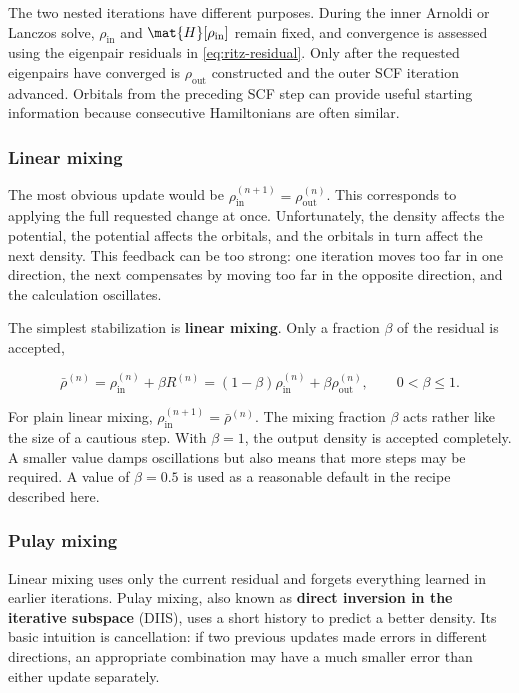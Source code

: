 The two nested iterations have different purposes. During the inner Arnoldi or Lanczos solve, \(\rho_{\text{in}}\) and \(\mat{H}[\rho_{\text{in}}]\) remain fixed, and convergence is assessed using the eigenpair residuals in \cref{eq:ritz-residual}. Only after the requested eigenpairs have converged is \(\rho_{\text{out}}\) constructed and the outer SCF iteration advanced. Orbitals from the preceding SCF step can provide useful starting information because consecutive Hamiltonians are often similar.

\subsubsection{Linear mixing}

The most obvious update would be \(\rho_{\text{in}}^{(n+1)}=\rho_{\text{out}}^{(n)}\). This corresponds to applying the full requested change at once. Unfortunately, the density affects the potential, the potential affects the orbitals, and the orbitals in turn affect the next density. This feedback can be too strong: one iteration moves too far in one direction, the next compensates by moving too far in the opposite direction, and the calculation oscillates.

The simplest stabilization is \textbf{linear mixing}. Only a fraction \(\beta\) of the residual is accepted,

\begin{equation}
    \bar{\rho}^{(n)}
    =\rho_{\text{in}}^{(n)}+\beta R^{(n)}
    =(1-\beta)\rho_{\text{in}}^{(n)}
    +\beta\rho_{\text{out}}^{(n)},
    \qquad 0<\beta\leq 1.
    \label{eq:linear-mixing}
\end{equation}

For plain linear mixing, \(\rho_{\text{in}}^{(n+1)}=\bar{\rho}^{(n)}\). The mixing fraction \(\beta\) acts rather like the size of a cautious step. With \(\beta=1\), the output density is accepted completely. A smaller value damps oscillations but also means that more steps may be required. A value of \(\beta=0.5\) is used as a reasonable default in the recipe described here.

\subsubsection{Pulay mixing}

Linear mixing uses only the current residual and forgets everything learned in earlier iterations. Pulay mixing, also known as \textbf{direct inversion in the iterative subspace} (DIIS), uses a short history to predict a better density.\cite{1980:pulay} Its basic intuition is cancellation: if two previous updates made errors in different directions, an appropriate combination may have a much smaller error than either update separately.

